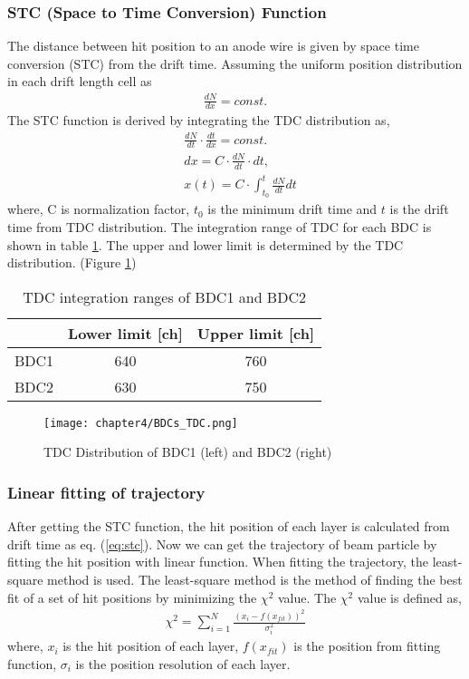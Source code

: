 \subsubsection{STC (Space to Time Conversion) Function}
The distance between hit position to an anode wire is given by space time conversion (STC) from the drift time. Assuming the uniform position distribution in each drift length cell as
\begin{align}
    \frac{dN}{dx} = const.  
\end{align}
The STC function is derived by integrating the TDC distribution as,
\begin{align}
    &\frac{dN}{dt} \cdot \frac{dt}{dx} = const.\\
    &dx = C \cdot \frac{dN}{dt} \cdot dt,\\
    &x(t) = C \cdot \int_{t_{0}}^{t} \frac{dN}{dt} dt \label{eq:stc}
\end{align}
where, C is normalization factor, $t_0$ is the minimum drift time and $t$ is the drift time from TDC distribution. 
The integration range of TDC for each BDC is shown in table \ref{tab:TDC_BDCs}. The upper and lower limit is determined by the TDC distribution. (Figure \ref{fig:TDC_BDCs}) 
\begin{table}[h]
    \centering
    \begin{tabular}{c|cc}
        \hline
        &Lower limit [ch]& Upper limit [ch]\\
        \hline
        BDC1&640&760\\
        BDC2&630&750\\        
        \hline
    \end{tabular}
    \caption[TDC integration ranges of BDCs]{TDC integration ranges of BDC1 and BDC2}
    \label{tab:TDC_BDCs}
\end{table}

\begin{figure}
    \centering
    \texttt{[image: chapter4/BDCs\_TDC.png]}
    \caption[TDC Distribution of BDCs]{TDC Distribution of BDC1 (left) and BDC2 (right)}
    \label{fig:TDC_BDCs}
\end{figure}

\subsubsection{Linear fitting of trajectory}
After getting the STC function, the hit position of each layer is calculated from drift time as eq. (\ref{eq:stc}). Now we can get the trajectory of beam particle by fitting the hit position with linear function. When fitting the trajectory, the least-square method is used. The least-square method is the method of finding the best fit of a set of hit positions by minimizing the $\chi^2$ value. The $\chi^2$ value is defined as,
\begin{align}
    \chi^2 = \sum_{i=1}^{N} \frac{(x_{i} - f(x_{fit}))^2}{\sigma_{i}^2}
\end{align}
where, $x_{i}$ is the hit position of each layer, $f(x_{fit})$ is the position from fitting function, $\sigma_{i}$ is the position resolution of each layer.

